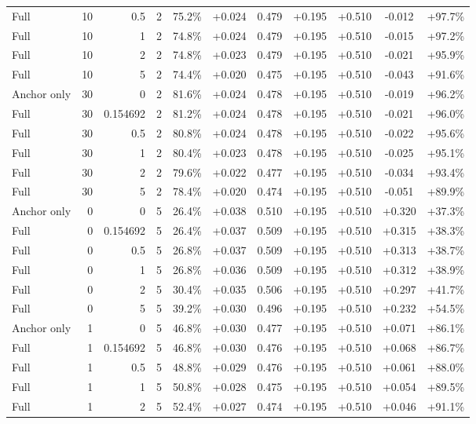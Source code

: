 \begin{table}[htbp]
\begin{tabular}{lrrrccccccc}
Full & 10 & 0.5 & 2 & 75.2\% & +0.024 & 0.479 & +0.195 & +0.510 & -0.012 & +97.7\% \\
Full & 10 & 1 & 2 & 74.8\% & +0.024 & 0.479 & +0.195 & +0.510 & -0.015 & +97.2\% \\
Full & 10 & 2 & 2 & 74.8\% & +0.023 & 0.479 & +0.195 & +0.510 & -0.021 & +95.9\% \\
Full & 10 & 5 & 2 & 74.4\% & +0.020 & 0.475 & +0.195 & +0.510 & -0.043 & +91.6\% \\
Anchor only & 30 & 0 & 2 & 81.6\% & +0.024 & 0.478 & +0.195 & +0.510 & -0.019 & +96.2\% \\
Full & 30 & 0.154692 & 2 & 81.2\% & +0.024 & 0.478 & +0.195 & +0.510 & -0.021 & +96.0\% \\
Full & 30 & 0.5 & 2 & 80.8\% & +0.024 & 0.478 & +0.195 & +0.510 & -0.022 & +95.6\% \\
Full & 30 & 1 & 2 & 80.4\% & +0.023 & 0.478 & +0.195 & +0.510 & -0.025 & +95.1\% \\
Full & 30 & 2 & 2 & 79.6\% & +0.022 & 0.477 & +0.195 & +0.510 & -0.034 & +93.4\% \\
Full & 30 & 5 & 2 & 78.4\% & +0.020 & 0.474 & +0.195 & +0.510 & -0.051 & +89.9\% \\
Anchor only & 0 & 0 & 5 & 26.4\% & +0.038 & 0.510 & +0.195 & +0.510 & +0.320 & +37.3\% \\
Full & 0 & 0.154692 & 5 & 26.4\% & +0.037 & 0.509 & +0.195 & +0.510 & +0.315 & +38.3\% \\
Full & 0 & 0.5 & 5 & 26.8\% & +0.037 & 0.509 & +0.195 & +0.510 & +0.313 & +38.7\% \\
Full & 0 & 1 & 5 & 26.8\% & +0.036 & 0.509 & +0.195 & +0.510 & +0.312 & +38.9\% \\
Full & 0 & 2 & 5 & 30.4\% & +0.035 & 0.506 & +0.195 & +0.510 & +0.297 & +41.7\% \\
Full & 0 & 5 & 5 & 39.2\% & +0.030 & 0.496 & +0.195 & +0.510 & +0.232 & +54.5\% \\
Anchor only & 1 & 0 & 5 & 46.8\% & +0.030 & 0.477 & +0.195 & +0.510 & +0.071 & +86.1\% \\
Full & 1 & 0.154692 & 5 & 46.8\% & +0.030 & 0.476 & +0.195 & +0.510 & +0.068 & +86.7\% \\
Full & 1 & 0.5 & 5 & 48.8\% & +0.029 & 0.476 & +0.195 & +0.510 & +0.061 & +88.0\% \\
Full & 1 & 1 & 5 & 50.8\% & +0.028 & 0.475 & +0.195 & +0.510 & +0.054 & +89.5\% \\
Full & 1 & 2 & 5 & 52.4\% & +0.027 & 0.474 & +0.195 & +0.510 & +0.046 & +91.1\% \\

\end{tabular}
\end{table}
